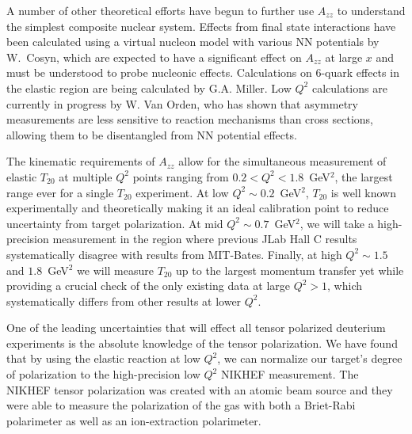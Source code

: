 A number of other theoretical efforts have begun to further use $A_{zz}$ to understand the simplest composite nuclear system. Effects from final state interactions have been calculated using a virtual nucleon model with various NN potentials by W.~Cosyn, which are expected to have a significant effect on $A_{zz}$ at large $x$ and must be understood to probe nucleonic effects. Calculations on 6-quark effects in the elastic region are being calculated by G.A. Miller. Low $Q^2$ calculations are currently in progress by W. Van Orden, who has shown that asymmetry measurements are less sensitive to reaction mechanisms than cross sections, allowing them to be disentangled from NN potential effects. 


The kinematic requirements of $A_{zz}$ allow for the simultaneous measurement of elastic $T_{20}$ at multiple $Q^2$ points ranging from $0.2<Q^2<1.8$~GeV$^2$, the largest range ever for a single $T_{20}$ experiment. At low $Q^2\sim0.2$~GeV$^2$, $T_{20}$ is well known experimentally and theoretically making it an ideal calibration point to reduce uncertainty from target polarization. At mid $Q^2\sim0.7$~GeV$^2$, we will take a high-precision measurement in the region where previous JLab Hall C results systematically disagree with results from MIT-Bates. Finally, at high $Q^2\sim1.5$ and $1.8$~GeV$^2$ we will measure $T_{20}$ up to the largest momentum transfer yet while providing a crucial check of the only existing data at large $Q^2>1$, which systematically differs from other results at lower $Q^2$.

One of the leading uncertainties that will effect all tensor polarized deuterium experiments is the absolute knowledge of the tensor polarization.   We have found that by using the elastic reaction at low $Q^2$, we can normalize our target's degree of polarization to the high-precision low $Q^2$ NIKHEF measurement.  The NIKHEF tensor polarization was created with an atomic beam source and they were able to measure the polarization of the gas with both a Briet-Rabi polarimeter as well as an ion-extraction polarimeter. 

